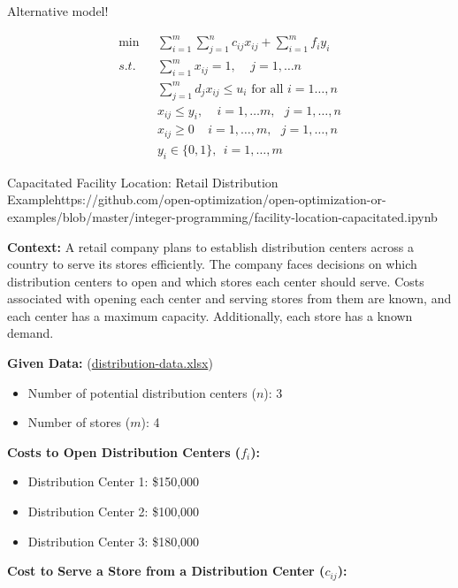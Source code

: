 Alternative model!

\begin{align*}
\min \ \ \ & \sum_{i = 1}^m\sum_{j=1}^n c_{ij}x_{ij}+\sum_{i = 1}^mf_iy_i\\
s.t.&  \sum_{i = 1}^mx_{ij} = 1,~~~~~j =1,\ldots n\\
& \displaystyle \sum_{j=1}^md_jx_{ij}\leqslant u_i\text{ for all }i=1\dots,n \tag{capacity of facility $i$}\\
&x_{ij}\leq y_i,~~~~~ i = 1,\ldots m,~~~ j = 1,\ldots,n\\
&  x_{ij} \geq 0~~~~~ i = 1,\ldots,m, ~~~j = 1,\ldots,n\\
& y_i\in \{0,1\}, \  \  i = 1,\ldots,m
\end{align*}

\begin{examplewithcode}{Capacitated Facility Location: Retail Distribution Example}{https://github.com/open-optimization/open-optimization-or-examples/blob/master/integer-programming/facility-location-capacitated.ipynb}

\textbf{Context:} A retail company plans to establish distribution centers across a country to serve its stores efficiently. The company faces decisions on which distribution centers to open and which stores each center should serve. Costs associated with opening each center and serving stores from them are known, and each center has a maximum capacity. Additionally, each store has a known demand.

\textbf*{Given Data:} (\href{https://github.com/open-optimization/open-optimization-or-examples/blob/master/integer-programming/distribution-data.xlsx}{distribution-data.xlsx})

\begin{itemize}
    \item Number of potential distribution centers ($n$): 3
    \item Number of stores ($m$): 4
\end{itemize}

\noindent\textbf{Costs to Open Distribution Centers ($f_i$):}
\begin{itemize}
    \item Distribution Center 1: \$150,000
    \item Distribution Center 2: \$100,000
    \item Distribution Center 3: \$180,000
\end{itemize}

\noindent\textbf{Cost to Serve a Store from a Distribution Center ($c_{ij}$):}


\end{examplewithcode}

